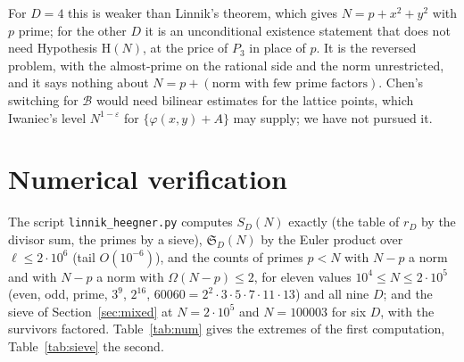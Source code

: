 \documentclass[11pt]{amsart}
\theoremstyle{definition}
\theoremstyle{remark}
\newcommand{\e}{\varepsilon}
\newcommand{\sS}{\mathfrak S}
\begin{document}
For $D=4$ this is weaker than Linnik's theorem, which gives $N=p+x^2+y^2$ with $p$ prime; for the other $D$ it is an unconditional existence statement that does not need Hypothesis $\mathrm H(N)$, at the price of $P_3$ in place of $p$. It is the reversed problem, with the almost-prime on the rational side and the norm unrestricted, and it says nothing about $N=p+(\text{norm with few prime factors})$. Chen's switching for $\mathcal B$ would need bilinear estimates for the lattice points, which Iwaniec's level $N^{1-\e}$ for $\{\varphi(x,y)+A\}$ \cite{Iwaniec72} may supply; we have not pursued it.

\section{Numerical verification}\label{sec:num}
The script \texttt{linnik\_heegner.py} computes $S_D(N)$ exactly (the table of $r_D$ by the divisor sum, the primes by a sieve), $\sS_D(N)$ by the Euler product over $\ell\le2\cdot10^6$ (tail $O(10^{-6})$), and the counts of primes $p<N$ with $N-p$ a norm and with $N-p$ a norm with $\Omega(N-p)\le2$, for eleven values $10^4\le N\le2\cdot10^5$ (even, odd, prime, $3^9$, $2^{16}$, $60060=2^2\cdot3\cdot5\cdot7\cdot11\cdot13$) and all nine $D$; and the sieve of Section~\ref{sec:mixed} at $N=2\cdot10^5$ and $N=100003$ for six $D$, with the survivors factored. Table~\ref{tab:num} gives the extremes of the first computation, Table~\ref{tab:sieve} the second.
\end{document}

